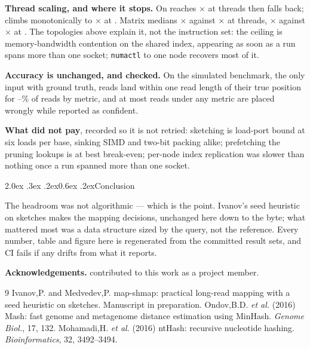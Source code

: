 \documentclass[10pt,a4paper,twocolumn]{article}
\makeatletter
\renewcommand\section{\@startsection{section}{1}{0pt}%
  {2.0ex \@plus .3ex \@minus .2ex}{0.6ex \@plus.2ex}{\normalsize\bfseries}}
\makeatother
\begin{document}
\textbf{Thread scaling, and where it stops.} On \shmScaleXPeakBench{}
\texttt{\shmHostX} reaches \shmScaleXPeak$\times$ at \shmScaleXPeakThreads{}
threads then falls back; \texttt{\shmHostA} climbs monotonically to
\shmScaleAPeak$\times$ at \shmScaleAPeakThreads. Matrix medians
\shmScaleXKnee$\times$ against \shmScaleAKnee$\times$ at \shmKneeThreads{}
threads, \shmScaleXCap$\times$ against \shmScaleACap$\times$ at \shmCapThreads.
The topologies above explain it, not the instruction set: the ceiling is
memory-bandwidth contention on the shared index, appearing as soon as a run
spans more than one socket; \texttt{numactl} to one node recovers most of it.

\textbf{Accuracy is unchanged, and checked.} On the simulated benchmark, the
only input with ground truth, reads land within one read length of their true
position for \shmAccMin--\shmAccMax\% of reads by metric, and at most
\shmWrongQMax{} reads under any metric are placed wrongly while reported as
confident.

\textbf{What did not pay}, recorded so it is not retried: sketching is
load-port bound at six loads per base, sinking SIMD and two-bit packing alike;
prefetching the pruning lookups is at best break-even; per-node index
replication was slower than nothing once a run spanned more than one socket.

\section{Conclusion}

The headroom was not algorithmic --- which is the point. Ivanov's seed
heuristic on sketches makes the mapping decisions, unchanged here down to the
byte; what mattered most was a data structure sized by the query, not the
reference. Every number, table and figure here is regenerated from the
committed result sets, and CI fails if any drifts from what it reports.

\small
\vspace{0.2em}
\noindent\textbf{Acknowledgements.} \shmContributors{} contributed to this
work as a project member.
\vspace{0.1em}

\begin{thebibliography}{9}
\setlength{\itemsep}{0pt}\setlength{\parskip}{0pt}
 Ivanov,P. and Medvedev,P. map-shmap: practical long-read mapping with a seed heuristic on sketches. Manuscript in preparation.
 Ondov,B.D. \emph{et al.} (2016) Mash: fast genome and metagenome distance estimation using MinHash. \emph{Genome Biol.}, 17, 132.
 Mohamadi,H. \emph{et al.} (2016) ntHash: recursive nucleotide hashing. \emph{Bioinformatics}, 32, 3492--3494.
\end{thebibliography}
\end{document}
